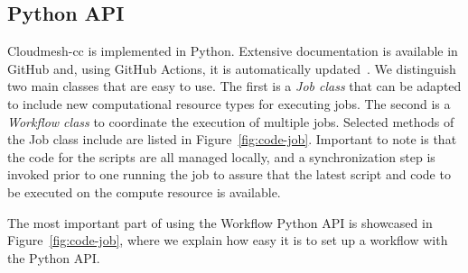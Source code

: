 

\subsection{Python API}

Cloudmesh-cc is implemented in Python. Extensive documentation is
available in GitHub and, using GitHub Actions, it is automatically
updated~\cite{github-cloudmesh-cc}. We distinguish two main classes
that are easy to use. The first is a {\em Job class} that can be
adapted to include new computational resource types for executing
jobs. The second is a {\em Workflow class} to coordinate the execution
of multiple jobs. Selected methods of the Job class include are listed
in Figure~\ref{fig:code-job}. Important to note is that the code for
the scripts are all managed locally, and a synchronization step is
invoked prior to one running the job to assure that the latest script
and code to be executed on the compute resource is available.

The most important part of using the Workflow Python API is showcased
in Figure~\ref{fig:code-job}, where we explain how easy it is to set
up a workflow with the Python API.


